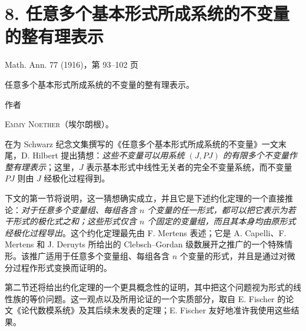 \section*{8. 任意多个基本形式所成系统的不变量的整有理表示}
\begin{center}
Math. Ann. 77 (1916)，第 93--102 页
\end{center}

\begin{center}
{\Large 任意多个基本形式所成系统的不变量的整有理表示。}\par
\vspace{1.2em}
作者\par
\vspace{0.8em}
{\scshape Emmy Noether}（埃尔朗根）。
\end{center}

在为 Schwarz 纪念文集撰写的《任意多个基本形式所成系统的不变量》一文末尾，D. Hilbert 提出猜想：\emph{这些不变量可以用系统 $(J,PJ)$ 的有限多个不变量作整有理表示}；这里，$J$ 表示基本形式中线性无关者的完全不变量系统，而不变量 $PJ$ 则由 $J$ 经极化过程得到。

下文的第一节将说明，这一猜想确实成立，并且它是下述约化定理的一个直接推论：\emph{对于任意多个变量组、每组各含 $n$ 个变量的任一形式，都可以把它表示为若干形式的极化式之和；这些形式仅含 $n$ 个固定的变量组，而且其本身均由原形式经极化过程导出}。这个约化定理最先由 F. Mertens 表述；它是 A. Capelli、F. Mertens 和 J. Deruyts 所给出的 Clebsch--Gordan 级数展开之推广的一个特殊情形。该推广适用于任意多个变量组、每组各含 $n$ 个变量的形式，并且是通过对微分过程作形式变换而证明的。

第二节还将给出约化定理的一个更具概念性的证明，其中把这个问题视为形式的线性族的等价问题。这一观点以及所用论证的一个实质部分，取自 E. Fischer 的论文《论代数模系统》及其后续未发表的定理；E. Fischer 友好地准许我使用这些结果。

